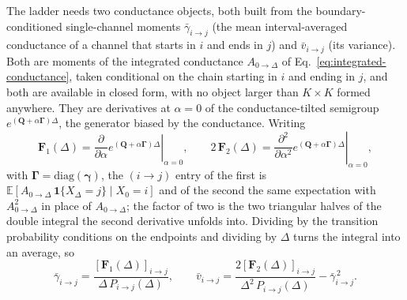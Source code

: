 \begin{appendixbox}
The ladder needs two conductance objects, both built from the boundary-conditioned
single-channel moments $\bar{\gamma}_{i\to j}$ (the mean interval-averaged
conductance of a channel that starts in $i$ and ends in $j$) and
$\bar{v}_{i\to j}$ (its variance). Both are moments of the integrated conductance
$A_{0\to\Delta}$ of Eq.~\ref{eq:integrated-conductance}, taken conditional on the chain starting
in $i$ and ending in $j$, and both are available in closed form, with no object larger
than $K\times K$ formed anywhere. They are derivatives at $\alpha=0$ of the conductance-tilted
semigroup $e^{(\mathbf{Q}+\alpha\bm{\Gamma})\Delta}$, the generator biased by the conductance.
Writing
\begin{equation}
  \mathbf{F}_1(\Delta)=\left.\frac{\partial}{\partial\alpha}
      e^{(\mathbf{Q}+\alpha\bm{\Gamma})\Delta}\right|_{\alpha=0},
  \qquad
  2\,\mathbf{F}_2(\Delta)=\left.\frac{\partial^{2}}{\partial\alpha^{2}}
      e^{(\mathbf{Q}+\alpha\bm{\Gamma})\Delta}\right|_{\alpha=0},
  \label{eq:tilted-derivatives}
\end{equation}
with $\bm{\Gamma}=\mathrm{diag}(\bm{\gamma})$, the $(i\to j)$ entry of the first is
$\mathbb{E}[A_{0\to\Delta}\,\mathbf{1}\{X_\Delta=j\}\mid X_0=i]$ and of the second the same
expectation with $A^2_{0\to\Delta}$ in place of $A_{0\to\Delta}$; the factor of two is the two
triangular halves of the double integral the second derivative unfolds into. Dividing by the
transition probability conditions on the endpoints and dividing by $\Delta$ turns the
integral into an average, so
\begin{equation}
  \bar{\gamma}_{i\to j}
    = \frac{[\mathbf{F}_1(\Delta)]_{i\to j}}{\Delta\,P_{i\to j}(\Delta)},
  \qquad
  \bar{v}_{i\to j}
    = \frac{2[\mathbf{F}_2(\Delta)]_{i\to j}}{\Delta^2\,P_{i\to j}(\Delta)}
      - \bar{\gamma}^{\,2}_{i\to j}.
  \label{eq:gammabar-vbar}
\end{equation}


\end{appendixbox}
